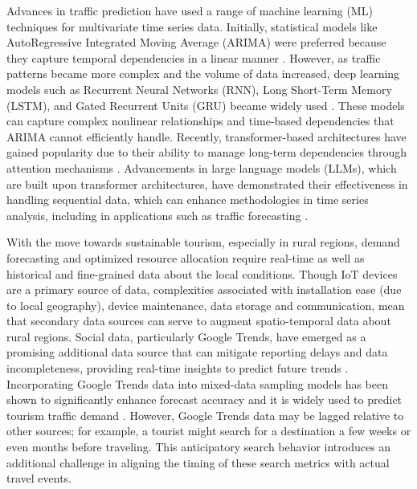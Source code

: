 \documentclass[acmsmall]{acmart}
\begin{document}
Advances in traffic prediction have used a range of machine learning {\color{black}(ML)} techniques for multivariate time series data. Initially, statistical models like AutoRegressive Integrated Moving Average (ARIMA) were preferred because they capture temporal dependencies in a linear manner \cite{shahriari2020ensemble, kumar2022time}. However, as traffic patterns became more complex and the volume of data increased, deep learning models such as Recurrent Neural Networks (RNN), Long Short-Term Memory (LSTM), and Gated Recurrent Units (GRU) became widely used \cite{ismaeel2023traffic, liu2020traffic, hussain2021intelligent}. These models can capture complex nonlinear relationships and time-based dependencies that ARIMA cannot efficiently handle. Recently, transformer-based architectures have gained popularity due to their ability to manage long-term dependencies through attention mechanisms \cite{reza2022multi, yu2023multi,bolanos2025sasd}. Advancements in large language models (LLMs), which are built upon transformer architectures, have demonstrated their effectiveness in handling sequential data, which can 
enhance methodologies in time series analysis, including in applications such as traffic forecasting \cite{reza2022multi, yu2023multi}.


With the move towards sustainable tourism, especially in rural regions, demand forecasting and optimized resource allocation require real-time as well as historical and fine-grained data about the local conditions. Though IoT devices are a primary source of data, complexities associated with installation ease (due to local geography), device maintenance, data storage and communication, mean that secondary data sources can serve to augment spatio-temporal data about rural regions. 
Social data, particularly Google Trends, have emerged as a promising additional data source that can mitigate reporting delays and data incompleteness, providing real-time insights to predict future trends \cite{choi2012predicting}. Incorporating Google Trends data into mixed-data sampling models has been shown to significantly enhance forecast accuracy \cite{bangwayo2015can} and it is widely used to predict tourism traffic demand \cite{xiao2020tourism, onder2017forecasting}.  However, Google Trends data may be lagged relative to other sources; for example, a tourist might search for a destination a few weeks or even months before traveling. This anticipatory search behavior introduces an additional challenge in aligning the timing of these search metrics with actual travel events.
\end{document}

